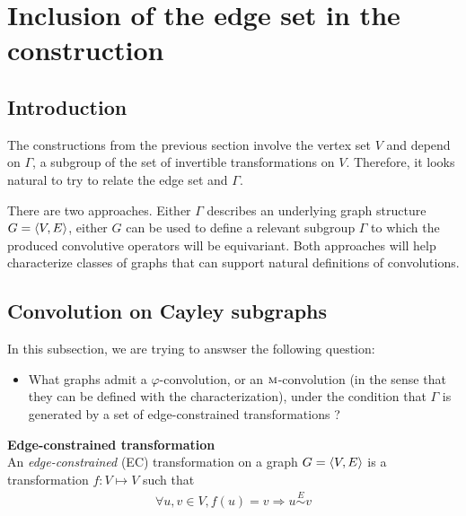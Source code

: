 \section{Inclusion of the edge set in the construction}
\label{sec:edges}

\subsection{Introduction}

The constructions from the previous section involve the vertex set $V$ and depend on $\Gamma$, a subgroup of the set of invertible transformations on $V$. Therefore, it looks natural to try to relate the edge set and $\Gamma$.

There are two approaches. Either $\Gamma$ describes an underlying graph structure $G = \langle V, E \rangle$, either $G$ can be used to define a relevant subgroup $\Gamma$ to which the produced convolutive operators will be equivariant. Both approaches will help characterize classes of graphs that can support natural definitions of convolutions.




\subsection{Convolution on Cayley subgraphs}

In this subsection, we are trying to answser the following question:
\begin{itemize}
	\item What graphs admit a $\varphi$-convolution, or an $\operatorname{\textsc{m}}$-convolution (in the sense that they can be defined with the characterization), under the condition that $\Gamma$ is generated by a set of edge-constrained transformations ?
\end{itemize}

\begin{definition}\textbf{Edge-constrained transformation}\\
An \emph{edge-constrained} (EC) transformation on a graph $G = \langle V, E \rangle$ is a transformation $f: V \mapsto V$ such that
\begin{gather*}
\forall u,v \in V, f(u) = v \Rightarrow u \overset{E}{\sim} v
\end{gather*}
\end{definition}

